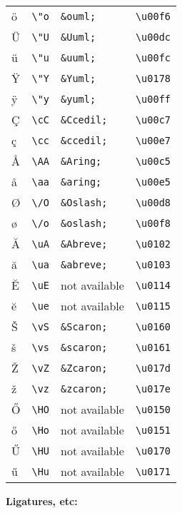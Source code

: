 \begin{longtable}[]{@{}llll@{}}
ö & \texttt{\textbackslash{}"o} & \texttt{\&ouml;} &
\texttt{\textbackslash{}u00f6}\tabularnewline
Ü & \texttt{\textbackslash{}"U} & \texttt{\&Uuml;} &
\texttt{\textbackslash{}u00dc}\tabularnewline
ü & \texttt{\textbackslash{}"u} & \texttt{\&uuml;} &
\texttt{\textbackslash{}u00fc}\tabularnewline
Ÿ & \texttt{\textbackslash{}"Y} & \texttt{\&Yuml;} &
\texttt{\textbackslash{}u0178}\tabularnewline
ÿ & \texttt{\textbackslash{}"y} & \texttt{\&yuml;} &
\texttt{\textbackslash{}u00ff}\tabularnewline
Ç & \texttt{\textbackslash{}cC} & \texttt{\&Ccedil;} &
\texttt{\textbackslash{}u00c7}\tabularnewline
ç & \texttt{\textbackslash{}cc} & \texttt{\&ccedil;} &
\texttt{\textbackslash{}u00e7}\tabularnewline
Å & \texttt{\textbackslash{}AA} & \texttt{\&Aring;} &
\texttt{\textbackslash{}u00c5}\tabularnewline
å & \texttt{\textbackslash{}aa} & \texttt{\&aring;} &
\texttt{\textbackslash{}u00e5}\tabularnewline
Ø & \texttt{\textbackslash{}/O} & \texttt{\&Oslash;} &
\texttt{\textbackslash{}u00d8}\tabularnewline
ø & \texttt{\textbackslash{}/o} & \texttt{\&oslash;} &
\texttt{\textbackslash{}u00f8}\tabularnewline
Ă & \texttt{\textbackslash{}uA} & \texttt{\&Abreve;} &
\texttt{\textbackslash{}u0102}\tabularnewline
ă & \texttt{\textbackslash{}ua} & \texttt{\&abreve;} &
\texttt{\textbackslash{}u0103}\tabularnewline
Ĕ & \texttt{\textbackslash{}uE} & not available &
\texttt{\textbackslash{}u0114}\tabularnewline
ĕ & \texttt{\textbackslash{}ue} & not available &
\texttt{\textbackslash{}u0115}\tabularnewline
Š & \texttt{\textbackslash{}vS} & \texttt{\&Scaron;} &
\texttt{\textbackslash{}u0160}\tabularnewline
š & \texttt{\textbackslash{}vs} & \texttt{\&scaron;} &
\texttt{\textbackslash{}u0161}\tabularnewline
Ž & \texttt{\textbackslash{}vZ} & \texttt{\&Zcaron;} &
\texttt{\textbackslash{}u017d}\tabularnewline
ž & \texttt{\textbackslash{}vz} & \texttt{\&zcaron;} &
\texttt{\textbackslash{}u017e}\tabularnewline
Ő & \texttt{\textbackslash{}HO} & not available &
\texttt{\textbackslash{}u0150}\tabularnewline
ő & \texttt{\textbackslash{}Ho} & not available &
\texttt{\textbackslash{}u0151}\tabularnewline
Ű & \texttt{\textbackslash{}HU} & not available &
\texttt{\textbackslash{}u0170}\tabularnewline
ű & \texttt{\textbackslash{}Hu} & not available &
\texttt{\textbackslash{}u0171}\tabularnewline
\bottomrule
\end{longtable}

\textbf{Ligatures, etc:}

